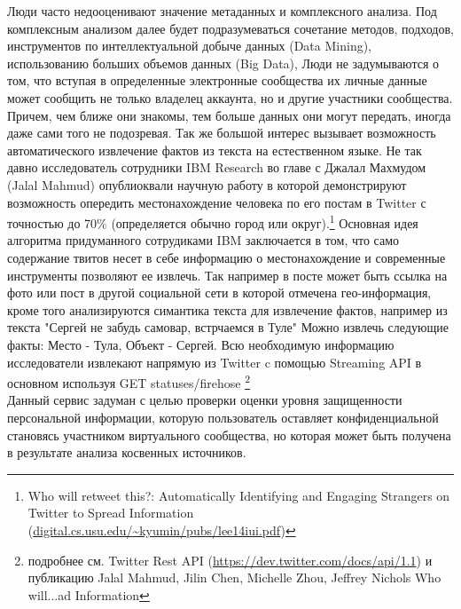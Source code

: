 \begin{chap1}
Люди часто недооценивают значение метаданных и комплексного анализа. 
Под комплексным анализом далее будет подразумеваться сочетание методов, подходов, инструментов по интеллектуальной добыче данных (Data Mining), %
использованию больших объемов данных (Big Data), 
Люди не задумываются о том, что вступая в определенные электронные сообщества их личные данные может сообщить не только владелец аккаунта, но и другие участники сообщества. Причем, чем ближе они знакомы, тем больше данных они могут передать, иногда даже сами того не подозревая. Так же большой интерес вызывает возможность автоматического извлечение фактов из текста на естественном языке. Не так давно исследователь сотрудники IBM Research во главе с Джалал Махмудом (Jalal Mahmud) опублиоквали научную работу в которой демонстрируют возможность опередить местонахождение человека по его постам в Twitter с точностью до 70\% (определяется обычно город или округ).\footnote{Who will retweet this?: Automatically Identifying and Engaging Strangers on Twitter to Spread Information (\url{digital.cs.usu.edu/~kyumin/pubs/lee14iui.pdf‎})}
 Основная идея алгоритма придуманного сотрудиками IBM заключается в том, что само содержание твитов несет в себе информацию о местонахождение и современные  инструменты  позволяют ее извлечь. Так например в посте может быть ссылка на фото или пост в другой социальной сети в которой отмечена гео-информация, кроме того анализируются симантика текста для извлечение фактов, например из текста "Сергей не забудь самовар, встрчаемся в Туле" Можно извлечь следующие факты: Место - Тула, Объект - Сергей. Всю необходимую информацию исследователи извлекают напрямую из Twitter c помощью Streaming API в основном используя GET statuses/firehose \footnote{подробнее см. Twitter Rest API (\url{https://dev.twitter.com/docs/api/1.1}) и публикацию Jalal Mahmud, Jilin Chen, Michelle Zhou, Jeffrey Nichols Who will...ad Information} \\



Данный сервис задуман с целью проверки оценки уровня защищенности персональной информации, которую пользователь оставляет конфиденциальной становясь участником виртуального сообщества, но которая может быть получена в результате анализа косвенных источников. \\


\end{chap1}
